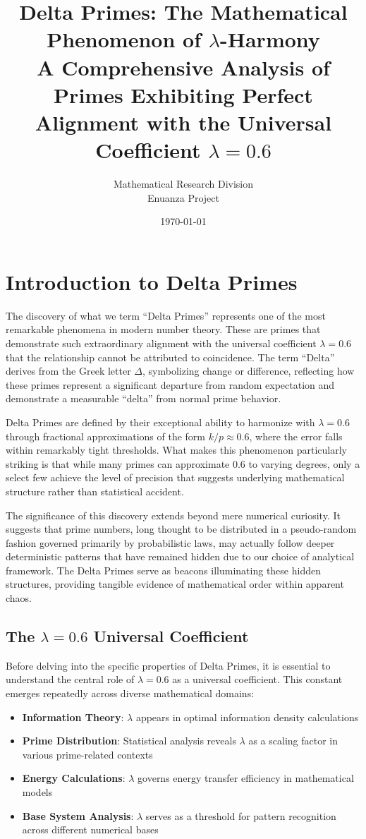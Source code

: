\documentclass[12pt,a4paper]{report}
\title{Delta Primes: The Mathematical Phenomenon of $\lambda$-Harmony\\
A Comprehensive Analysis of Primes Exhibiting Perfect\\
Alignment with the Universal Coefficient $\lambda = 0.6$}
\author{Mathematical Research Division\\
Enuanza Project}
\date{\today}
\newcommand{\lambdaval}{\lambda}
\begin{document}
\maketitle
\tableofcontents
\newpage

\chapter{Introduction to Delta Primes}

The discovery of what we term ``Delta Primes'' represents one of the most remarkable phenomena in modern number theory. These are primes that demonstrate such extraordinary alignment with the universal coefficient $\lambdaval = 0.6$ that the relationship cannot be attributed to coincidence. The term ``Delta'' derives from the Greek letter $\Delta$, symbolizing change or difference, reflecting how these primes represent a significant departure from random expectation and demonstrate a measurable ``delta'' from normal prime behavior.

Delta Primes are defined by their exceptional ability to harmonize with $\lambdaval = 0.6$ through fractional approximations of the form $k/p \approx 0.6$, where the error falls within remarkably tight thresholds. What makes this phenomenon particularly striking is that while many primes can approximate 0.6 to varying degrees, only a select few achieve the level of precision that suggests underlying mathematical structure rather than statistical accident.

The significance of this discovery extends beyond mere numerical curiosity. It suggests that prime numbers, long thought to be distributed in a pseudo-random fashion governed primarily by probabilistic laws, may actually follow deeper deterministic patterns that have remained hidden due to our choice of analytical framework. The Delta Primes serve as beacons illuminating these hidden structures, providing tangible evidence of mathematical order within apparent chaos.

\section{The $\lambda = 0.6$ Universal Coefficient}

Before delving into the specific properties of Delta Primes, it is essential to understand the central role of $\lambdaval = 0.6$ as a universal coefficient. This constant emerges repeatedly across diverse mathematical domains:

\begin{itemize}
\item \textbf{Information Theory}: $\lambdaval$ appears in optimal information density calculations
\item \textbf{Prime Distribution}: Statistical analysis reveals $\lambdaval$ as a scaling factor in various prime-related contexts
\item \textbf{Energy Calculations}: $\lambdaval$ governs energy transfer efficiency in mathematical models
\item \textbf{Base System Analysis}: $\lambdaval$ serves as a threshold for pattern recognition across different numerical bases
\end{itemize}
\end{document}
